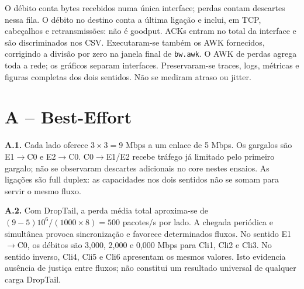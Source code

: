 \documentclass[runningheads]{llncs}
\begin{document}
O débito conta bytes recebidos numa única interface; perdas contam descartes nessa fila. O débito no destino conta a última ligação e inclui, em TCP, cabeçalhos e retransmissões: não é goodput. ACKs entram no total da interface e são discriminados nos CSV. Executaram-se também os AWK fornecidos, corrigindo a divisão por zero na janela final de \texttt{bw.awk}. O AWK de perdas agrega toda a rede; os gráficos separam interfaces. Preservaram-se traces, logs, métricas e figuras completas dos dois sentidos. Não se mediram atraso ou jitter.

\section{A -- Best-Effort}
\textbf{A.1.} Cada lado oferece $3\times3=9$ Mbps a um enlace de 5 Mbps. Os gargalos são E1$\to$C0 e E2$\to$C0. C0$\to$E1/E2 recebe tráfego já limitado pelo primeiro gargalo; não se observaram descartes adicionais no core nestes ensaios. As ligações são full duplex: as capacidades nos dois sentidos não se somam para servir o mesmo fluxo.

\textbf{A.2.} Com DropTail, a perda média total aproxima-se de $(9-5)10^6/(1000\times8)=500$ pacotes/s por lado. A chegada periódica e simultânea provoca sincronização e favorece determinados fluxos. No sentido E1$\to$C0, os débitos são 3,000, 2,000 e 0,000 Mbps para Cli1, Cli2 e Cli3. No sentido inverso, Cli4, Cli5 e Cli6 apresentam os mesmos valores. Isto evidencia ausência de justiça entre fluxos; não constitui um resultado universal de qualquer carga DropTail.
\end{document}
